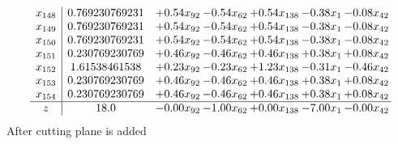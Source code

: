 \documentclass[8pt]{article}
\begin{document}
\[\begin{array}{c| c c@{\hskip 2pt} c@{\hskip 2pt} c@{\hskip 2pt} c@{\hskip 2pt} c@{\hskip 2pt} }
 x_{148}   &  0.769230769231 & +  0.54 x_{92} & -0.54 x_{62} & +  0.54 x_{138} & -0.38 x_{1} & -0.08 x_{42}\\
 x_{149}   &  0.769230769231 & +  0.54 x_{92} & -0.54 x_{62} & +  0.54 x_{138} & -0.38 x_{1} & -0.08 x_{42}\\
 x_{150}   &  0.769230769231 & +  0.54 x_{92} & -0.54 x_{62} & +  0.54 x_{138} & -0.38 x_{1} & -0.08 x_{42}\\
 x_{151}   &  0.230769230769 & +  0.46 x_{92} & -0.46 x_{62} & +  0.46 x_{138} & +  0.38 x_{1} & +  0.08 x_{42}\\
 x_{152}   &  1.61538461538 & +  0.23 x_{92} & -0.23 x_{62} & +  1.23 x_{138} & -0.31 x_{1} & -0.46 x_{42}\\
 x_{153}   &  0.230769230769 & +  0.46 x_{92} & -0.46 x_{62} & +  0.46 x_{138} & +  0.38 x_{1} & +  0.08 x_{42}\\
 x_{154}   &  0.230769230769 & +  0.46 x_{92} & -0.46 x_{62} & +  0.46 x_{138} & +  0.38 x_{1} & +  0.08 x_{42}\\
\hline
z    &  18.0 & -0.00 x_{92} & -1.00 x_{62} & +  0.00 x_{138} & -7.00 x_{1} & -0.00 x_{42}\\
\end{array}\]
 After cutting plane is added 
\end{document}
